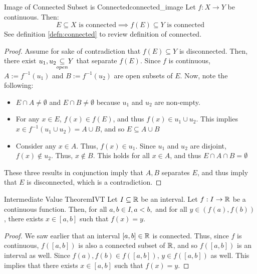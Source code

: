 \begin{thm}{Image of Connected Subset is Connected}{connected_image}
Let \(f:X\to Y\) be continuous. Then:
\begin{equation*}
  E \subseteq X \textrm{ is connected} \implies f(E) \subseteq Y \textrm{ is connected}
\end{equation*}
See definition \ref{defn:connected} to review definition of connected. \newline 

\begin{proof}
Assume for sake of contradiction that \(f(E) \subseteq Y\) is disconnected. Then, there exist \(u_1,u_2 {\underset{open}{\subseteq}} Y\) that separate \(f(E)\). Since \(f\) is continuous, \(A := f^{-1}(u_1)\) and \(B := f^{-1}(u_2)\) are open subsets of \(E\). Now, note the following:
\begin{itemize}
  \item \(E \cap A \neq \emptyset\) and \(E \cap B \neq \emptyset\) because \(u_1\) and \(u_2\) are non-empty.
  \item For any \(x \in E\), \(f(x) \in f(E)\), and thus \(f(x) \in u_1 \cup u_2\). This implies \(x \in f^{-1}(u_1 \cup u_2) = A \cup B\), and so \(E \subseteq A \cup B\)
  \item Consider any \(x \in A\). Thus, \(f(x) \in u_1\).  Since \(u_1\) and \(u_2\) are disjoint, \(f(x) \not\in u_2\). Thus, \(x \not \in B\). This holds for all \(x \in A\), and thus \(E \cap A \cap B = \emptyset\)
\end{itemize}
These three results in conjunction imply that \(A,B\) separates \(E\), and thus imply that \(E\) is disconnected, which is a contradiction.

\end{proof}

\end{thm}

\begin{thm}{Intermediate Value Theorem}{IVT}
Let \(I \subseteq {\mathbb R}\) be an interval. Let \(f: I \to {\mathbb R}\) be a continuous function. Then, for all \(a,b \in I, a<b,\) and for all \(y\in (f(a), f(b))\), there exists \(x \in [a,b]\) such that \(f(x) = y\). \newline 

\begin{proof}
We saw earlier that an interval \([a,b] \in {\mathbb R}\) is connected. Thus, since \(f\) is continuous, \(f([a,b])\) is also a connected subset of \({\mathbb R}\), and so \(f([a,b])\) is an interval as well. Since \(f(a), f(b) \in f([a,b])\), \(y \in f([a,b])\) as well. This implies that there exists \(x \in [a,b]\) such that \(f(x) = y\).
\end{proof}


\end{thm}











